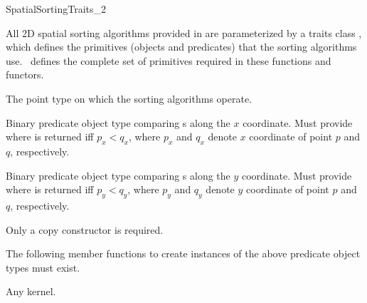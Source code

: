 

\begin{ccRefConcept}{SpatialSortingTraits_2}

\ccDefinition
  
All 2D spatial sorting algorithms provided in \cgal{} are parameterized
by a traits class , which defines the
primitives (objects and predicates) that the sorting algorithms use.
\ccRefName\ defines the complete set of primitives required in these
functions and functors.

\ccTypes
\ccAutoIndexingOff
{}

%
       {The point type on which the sorting algorithms operate.}


%
       {Binary predicate object type comparing s
        along the $x$ coordinate.
        Must provide 
         where 
        is returned iff $p_x < q_x$,
        where $p_x$ and $q_x$ denote $x$ coordinate of point $p$ and $q$,
        respectively.
       }

%
       {Binary predicate object type comparing s
        along the $y$ coordinate.
        Must provide 
         where 
        is returned iff $p_y < q_y$,
        where $p_y$ and $q_y$ denote $y$ coordinate of point $p$ and $q$,
        respectively.
       }


\ccCreation
{}  %

Only a copy constructor is required.


\ccOperations

The following member functions to create instances of the above predicate
object types must exist. 

\setlength\parskip{0mm}
\ccGlue
{}

\ccParDims
\ccHasModels

Any \cgal{} kernel.

\ccParDims
\end{ccRefConcept}


